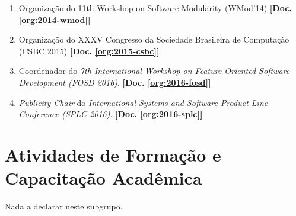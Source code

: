 \documentclass[a4paper,oneside,10pt]{article}
\begin{document}
\begin{enumerate}
\renewcommand{\labelenumi}{{\large\bfseries\arabic{enumi}.}}

    \item Organização do 11th Workshop on Software Modularity (WMod'14) \textbf{[Doc. \ref{org:2014-wmod}]}

    \item Organização do XXXV Congresso da Sociedade Brasileira de Computação (CSBC 2015) \textbf{[Doc. \ref{org:2015-csbc}]}

    \item Coordenador do \emph{7th International Workshop on Feature-Oriented Software Development (FOSD 2016)}. \textbf{[Doc. \ref{org:2016-fosd}]}

    \item \emph{Publicity Chair} do \emph{International Systems and Software Product Line Conference (SPLC 2016)}. \textbf{[Doc. \ref{org:2016-splc}]}


\end{enumerate}

\newpage
\section{Atividades de Forma\c{c}\~{a}o e Capacita\c{c}\~{a}o Acad\^{e}mica}
\vspace{0.3cm}


Nada a declarar neste subgrupo.
%
%
%
%
\end{document}
